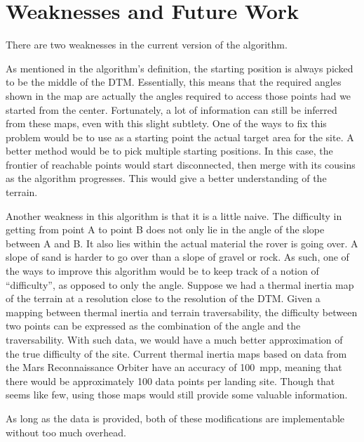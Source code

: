 \documentclass[12pt]{article}
\begin{document}
\section{Weaknesses and Future Work}
\label{sec:weaknesses_and_future_work}
\par There are two weaknesses in the current version of the algorithm.
\par As mentioned in the algorithm's definition, the starting position is always picked to be the middle of the DTM. Essentially, this means that the required angles shown in the map are actually the angles required to access those points had we started from the center. Fortunately, a lot of information can still be inferred from these maps, even with this slight subtlety. One of the ways to fix this problem would be to use as a starting point the actual target area for the site. A better method would be to pick multiple starting positions. In this case, the frontier of reachable points would start disconnected, then merge with its cousins as the algorithm progresses. This would give a better understanding of the terrain.
\par Another weakness in this algorithm is that it is a little naive. The difficulty in getting from point A to point B does not only lie in the angle of the slope between A and B. It also lies within the actual material the rover is going over. A slope of sand is harder to go over than a slope of gravel or rock. As such, one of the ways to improve this algorithm would be to keep track of a notion of ``difficulty'', as opposed to only the angle. Suppose we had a thermal inertia map of the terrain at a resolution close to the resolution of the DTM. Given a mapping between thermal inertia and terrain traversability, the difficulty between two points can be expressed as the combination of the angle and the traversability. With such data, we would have a much better approximation of the true difficulty of the site. Current thermal inertia maps based on data from the Mars Reconnaissance Orbiter have an accuracy of \SI{100}{mpp}, meaning that there would be approximately 100 data points per landing site. Though that seems like few, using those maps would still provide some valuable information.
\par As long as the data is provided, both of these modifications are implementable without too much overhead.
\end{document}
